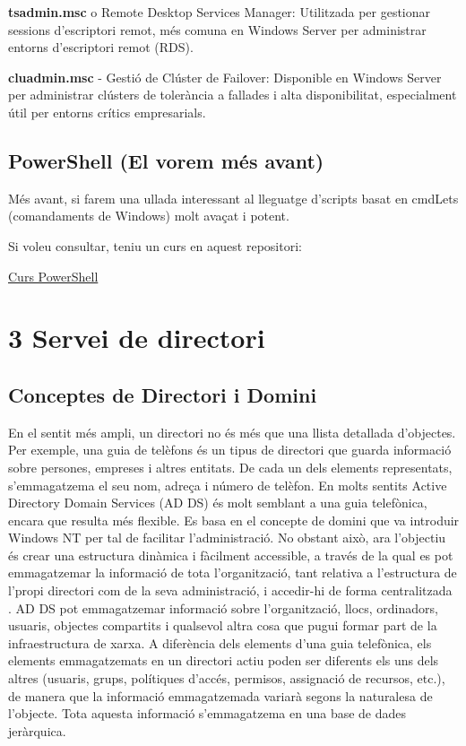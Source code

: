 \documentclass[
  a4paper,
]{article}
\begin{document}
\textbf{tsadmin.msc} o Remote Desktop Services Manager: Utilitzada per
gestionar sessions d'escriptori remot, més comuna en Windows Server per
administrar entorns d'escriptori remot (RDS).

\textbf{cluadmin.msc} - Gestió de Clúster de Failover: Disponible en
Windows Server per administrar clústers de tolerància a fallades i alta
disponibilitat, especialment útil per entorns crítics empresarials.

\subsection{PowerShell (El vorem més
avant)}\label{powershell-el-vorem-muxe9s-avant}

Més avant, si farem una ullada interessant al lleguatge d'scripts basat
en cmdLets (comandaments de Windows) molt avaçat i potent.

Si voleu consultar, teniu un curs en aquest repositori:

\href{https://github.com/tofermos/PowerShell}{Curs PowerShell}

\section{3 Servei de directori}\label{servei-de-directori}

\subsection{Conceptes de Directori i
Domini}\label{conceptes-de-directori-i-domini}

En el sentit més ampli, un directori no és més que una llista detallada
d'objectes. Per exemple, una guia de telèfons és un tipus de directori
que guarda informació sobre persones, empreses i altres entitats. De
cada un dels elements representats, s'emmagatzema el seu nom, adreça i
número de telèfon. En molts sentits Active Directory Domain Services (AD
DS) és molt semblant a una guia telefònica, encara que resulta més
flexible. Es basa en el concepte de domini que va introduir Windows NT
per tal de facilitar l'administració. No obstant això, ara l'objectiu és
crear una estructura dinàmica i fàcilment accessible, a través de la
qual es pot emmagatzemar la informació de tota l'organització, tant
relativa a l'estructura de l'propi directori com de la seva
administració, i accedir-hi de forma centralitzada . AD DS pot
emmagatzemar informació sobre l'organització, llocs, ordinadors,
usuaris, objectes compartits i qualsevol altra cosa que pugui formar
part de la infraestructura de xarxa. A diferència dels elements d'una
guia telefònica, els elements emmagatzemats en un directori actiu poden
ser diferents els uns dels altres (usuaris, grups, polítiques d'accés,
permisos, assignació de recursos, etc.), de manera que la informació
emmagatzemada variarà segons la naturalesa de l'objecte. Tota aquesta
informació s'emmagatzema en una base de dades jeràrquica.
\end{document}
